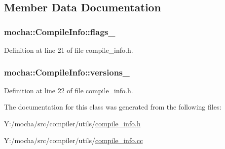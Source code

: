 \subsection{Member Data Documentation}
\hypertarget{classmocha_1_1_compile_info_ae4d19bdf1d84c07b62cd1691770c1e23}{
\subsubsection[{flags\_\-}]{ {\bf mocha::CompileInfo::flags\_\-}}}
\label{classmocha_1_1_compile_info_ae4d19bdf1d84c07b62cd1691770c1e23}


Definition at line 21 of file compile\_\-info.h.

\hypertarget{classmocha_1_1_compile_info_a532a170af6f6254ca78c4857cdef6713}{
\subsubsection[{versions\_\-}]{ {\bf mocha::CompileInfo::versions\_\-}}}
\label{classmocha_1_1_compile_info_a532a170af6f6254ca78c4857cdef6713}


Definition at line 22 of file compile\_\-info.h.



The documentation for this class was generated from the following files:\begin{DoxyCompactItemize}
\item 
Y:/mocha/src/compiler/utils/\hyperlink{compile__info_8h}{compile\_\-info.h}\item 
Y:/mocha/src/compiler/utils/\hyperlink{compile__info_8cc}{compile\_\-info.cc}\end{DoxyCompactItemize}

